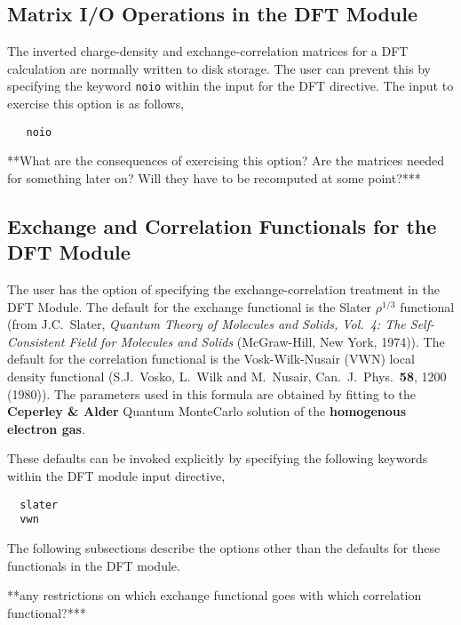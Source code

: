 \subsection{Matrix I/O Operations in the DFT Module}

The inverted charge-density and exchange-correlation matrices
for a DFT calculation are normally written to disk storage.  The user
can prevent this by specifying the keyword \verb+noio+ within the
input for the DFT directive.  The input to exercise this option is
as follows,

\begin{verbatim}
   noio
\end{verbatim}

\Large
**What are the consequences of exercising this option?  Are the matrices
needed for something later on?  Will they have to be recomputed at some
point?***
\normalsize

\subsection{Exchange and Correlation Functionals for the DFT Module}

The user has the option of specifying the exchange-correlation treatment 
in the DFT Module.  The default for the exchange functional is the 
Slater $\rho^{1/3}$ functional (from J.C.~Slater, 
{\sl Quantum Theory of Molecules and
Solids, Vol.~4: The Self-Consistent Field for Molecules and Solids}
(McGraw-Hill, New York, 1974)).  The default for the correlation
functional is the Vosk-Wilk-Nusair (VWN) local density functional
(S.J.~Vosko, L.~Wilk and M.~Nusair, 
Can.~J.~Phys.~{\bf  58}, 1200 (1980)).  The parameters used in this
formula are obtained by fitting to the {\bf Ceperley \&
Alder\footnotemark[1]} Quantum
MonteCarlo solution of the {\bf homogenous electron gas}.

These defaults can be invoked explicitly by specifying the following
keywords within the DFT module input directive,

\begin{verbatim}
  slater
  vwn
\end{verbatim}

The following subsections describe the options other than the defaults for
these functionals in the DFT module.
 
\Large
**any restrictions on which exchange functional goes with which correlation
functional?***
\normalsize

